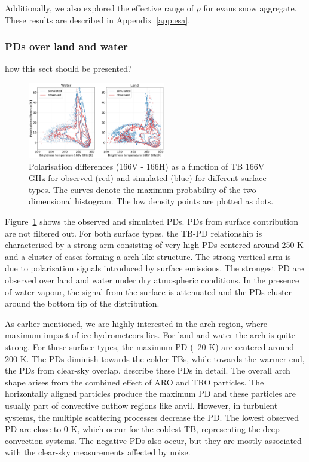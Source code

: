 \documentclass[amt, manuscript]{copernicus}
\newcommand{\todo}[1]{{\color{red} #1}}
\begin{document}
Additionally, we also explored the effective range of $\rho$ for evans snow aggregate. These results are described in Appendix~\ref{app:esa}. 


\subsubsection{PDs over land and water}
%
\todo{how this sect should be presented?}
\label{sec:PD}
\begin{figure}[t]
	\includegraphics[width=6cm]{Figures/hist2d_land_water_jan.pdf}
	\caption{Polarisation differences (166V - 166H) as a function of
		TB 166V GHz for observed (red) and simulated (blue) for
		different surface types. The curves denote the maximum probability of the two-dimensional histogram. The low density points are plotted as dots. }
	\label{fig:PD_water_land}
\end{figure}

Figure~\ref{fig:PD_water_land} shows the observed and simulated PDs. PDs from surface contribution are not filtered out. For both surface types, the TB-PD relationship is characterised by a strong arm consisting of very high PDs centered around 250\,\,K and a cluster of cases forming a arch like structure. The strong vertical arm is due to polarisation signals introduced by surface emissions. The strongest PD are observed over land and water under dry atmospheric conditions. In the presence of water vapour, the signal from the surface is attenuated and the PDs cluster around the bottom tip of the distribution. 

As earlier mentioned, we are highly interested in the arch region, where maximum impact of ice hydrometeors lies. For land and water the arch is quite strong. For these surface types, the maximum PD (~20\,\,K) are centered around 200\,\,K. The PDs diminish towards the colder TBs, while towards the warmer end, the PDs from clear-sky overlap. \citet{gong:micro:17} describe these PDs in detail. The overall arch shape arises from the combined effect of ARO and TRO particles. The horizontally aligned particles produce the maximum PD and these particles are usually part of convective outflow regions like anvil. However, in turbulent systems, the multiple scattering processes decrease the PD. The lowest observed PD are close to 0\,\,K, which occur for the coldest TB, representing the deep convection systems. The negative PDs also occur, but they are mostly associated with the clear-sky measurements affected by noise. 
\end{document}
